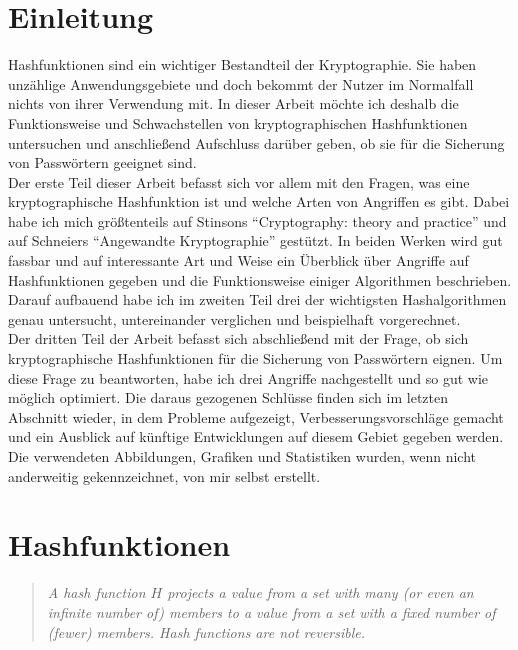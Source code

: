 \documentclass[12pt,a4paper]{scrartcl}
\newenvironment{italicquotes}
{\begin{quote}\itshape}
	{\end{quote}}
\numberwithin{equation}{section}
\numberwithin{myalgctr}{section}
\numberwithin{mytheoremctr}{section}
\begin{document}
	\section{Einleitung}
	Hashfunktionen sind ein wichtiger Bestandteil der Kryptographie. Sie haben unzählige Anwendungsgebiete und doch bekommt der Nutzer im Normalfall nichts von ihrer Verwendung mit. In dieser Arbeit möchte ich deshalb die Funktionsweise und Schwachstellen von kryptographischen Hashfunktionen untersuchen und anschließend Aufschluss darüber geben, ob sie für die Sicherung von Passwörtern geeignet sind. \\
	Der erste Teil dieser Arbeit befasst sich vor allem mit den Fragen, was eine kryptographische Hashfunktion ist und welche Arten von Angriffen es gibt. Dabei habe ich mich größtenteils auf Stinsons \textquotedblleft Cryptography: theory and practice\textquotedblright{} \autocite{cryptography} und auf Schneiers \textquotedblleft Angewandte Kryptographie\textquotedblright{} \autocite{angewandteKryptographie} gestützt. In beiden Werken wird gut fassbar und auf interessante Art und Weise ein Überblick über Angriffe auf Hashfunktionen gegeben und die Funktionsweise einiger Algorithmen beschrieben. \\
	Darauf aufbauend habe ich im zweiten Teil drei der wichtigsten Hashalgorithmen genau untersucht, untereinander verglichen und beispielhaft vorgerechnet.\\ 
	Der dritten Teil der Arbeit befasst sich abschließend mit der Frage, ob sich kryptographische Hashfunktionen für die Sicherung von Passwörtern eignen. Um diese Frage zu beantworten, habe ich drei Angriffe nachgestellt und so gut wie möglich optimiert. Die daraus gezogenen Schlüsse finden sich im letzten Abschnitt wieder, in dem Probleme aufgezeigt, Verbesserungsvorschläge gemacht und ein Ausblick auf künftige Entwicklungen auf diesem Gebiet gegeben werden.\\
	\newline
	Die verwendeten Abbildungen, Grafiken und Statistiken wurden, wenn nicht anderweitig gekennzeichnet, von mir selbst erstellt.
	
	\newpage
	\section{Hashfunktionen}
	\begin{italicquotes}
		A hash function $H$ projects a value from a set with many (or even an infinite number of) members to a value from a set with a fixed number of (fewer) members. Hash functions are not reversible.\autocite{hashDef}
	\end{italicquotes}
	
\end{document}
